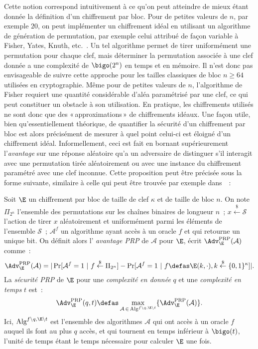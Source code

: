 Cette notion correspond intuitivement à ce qu'on peut atteindre de mieux étant donnée la définition d'un chiffrement par bloc.
Pour de petites valeurs de $n$, par exemple $20$, on peut
implémenter un chiffrement idéal en utilisant un algorithme de génération de permutation, par exemple celui attribué de façon
variable à Fisher, Yates, Knuth, etc.~\cite{uniform_shuffle}.
Un tel algorithme permet de tirer uniformément une permutation pour chaque clef, mais déterminer la permutation associée à
une clef donnée a une complexité de
$\bigo(2^n)$ en temps et en mémoire. Il n'est donc pas envisageable de suivre cette approche pour
les tailles classiques de bloc $n \geq 64$ utilisées en cryptographie.
Même pour de petites valeurs de $n$, l'algorithme de Fisher \etal requiert une quantité considérable d'aléa paramétrisé par une clef,
ce qui peut constituer un obstacle à son utilisation.
En pratique, les chiffrements utilisés ne sont donc que des «\,approximations\,» de chiffrements idéaux.
Une façon utile, bien qu'essentiellement théorique, de quantifier la sécurité d'un chiffrement par bloc est alors précisément
de mesurer à quel point celui-ci est éloigné d'un chiffrement idéal.
Informellement, ceci est fait en bornant supérieurement l'\emph{avantage} sur une réponse aléatoire qu'a un adversaire
de distinguer s'il interagit avec une permutation tirée aléatoirement
ou avec une instance du chiffrement paramétré avec une clef inconnue. Cette proposition peut être précisée
sous la forme suivante, similaire à celle qui peut être trouvée par exemple dans~\cite{DBLP:journals/jcss/BellareKR00}~:

\begin{fdefi}
Soit $\E$ un chiffrement par bloc de taille de clef $\kappa$ et de taille de bloc $n$.
On note
$\Pi_{2^n}$ l'ensemble des permutations sur les chaînes binaires de longueur $n$~; $x \overset{\$}{\leftarrow} \mathcal{S}$
l'action de tirer $x$ aléatoirement et uniformément parmi les éléments de l'ensemble $\mathcal{S}$~; $\mathcal{A}^{f}$
un algorithme ayant accès à un oracle $f$ et qui retourne un unique bit.
On définit alors
l' \emph{avantage PRP} de $\mathcal{A}$ pour $\E$, écrit $\Adv^{\text{PRP}}_{\E}(\mathcal{A})$ comme~:
\[
\Adv^{\text{PRP}}_{\E}(\mathcal{A}) = |\Pr[\mathcal{A}^f = 1~|~f \overset{\$}{\leftarrow} \Pi_{2^n}] - \Pr[\mathcal{A}^f = 1~|~f \defas \E(k,\cdot), k \overset{\$}{\leftarrow} \{0,1\}^\kappa]|.
\]
La \emph{sécurité PRP} de $\E$ pour une \emph{complexité en donnée} $q$ et une \emph{complexité en temps} $t$ est~:
\[
\Adv^{\text{PRP}}_{\E}(q,t) \defas \max_{\mathcal{A}\,\in\,\text{Alg}^{f\backslash q, \E\backslash t}} \{\Adv^{\text{PRP}}_{\E}(\mathcal{A})\}.
\]
Ici,
$\text{Alg}^{f\backslash q, \E\backslash t}$ est l'ensemble des algorithmes $\mathcal{A}$ qui ont accès à un oracle $f$ auquel ils font au plus $q$ accès,
et qui tournent en temps inférieur à
$\bigo(t)$, l'unité de temps étant le temps nécessaire pour calculer $\E$ une fois.
\label{def:fprp}
\end{fdefi}

